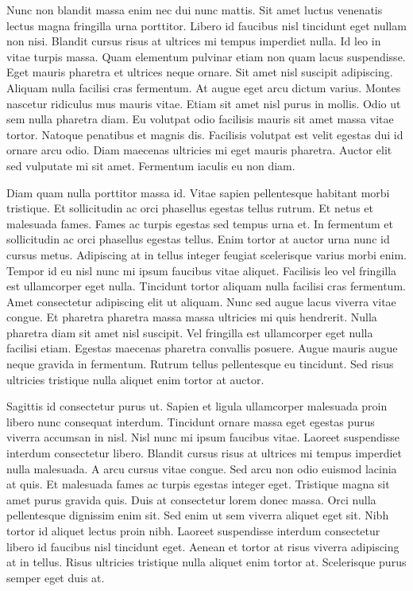 \documentclass[11pt,a4paper]{article}
\begin{document}
Nunc non blandit massa enim nec dui nunc mattis. Sit amet luctus venenatis lectus magna fringilla urna porttitor. Libero id faucibus nisl tincidunt eget nullam non nisi. Blandit cursus risus at ultrices mi tempus imperdiet nulla. Id leo in vitae turpis massa. Quam elementum pulvinar etiam non quam lacus suspendisse. Eget mauris pharetra et ultrices neque ornare. Sit amet nisl suscipit adipiscing. Aliquam nulla facilisi cras fermentum. At augue eget arcu dictum varius. Montes nascetur ridiculus mus mauris vitae. Etiam sit amet nisl purus in mollis. Odio ut sem nulla pharetra diam. Eu volutpat odio facilisis mauris sit amet massa vitae tortor. Natoque penatibus et magnis dis. Facilisis volutpat est velit egestas dui id ornare arcu odio. Diam maecenas ultricies mi eget mauris pharetra. Auctor elit sed vulputate mi sit amet. Fermentum iaculis eu non diam.

Diam quam nulla porttitor massa id. Vitae sapien pellentesque habitant morbi tristique. Et sollicitudin ac orci phasellus egestas tellus rutrum. Et netus et malesuada fames. Fames ac turpis egestas sed tempus urna et. In fermentum et sollicitudin ac orci phasellus egestas tellus. Enim tortor at auctor urna nunc id cursus metus. Adipiscing at in tellus integer feugiat scelerisque varius morbi enim. Tempor id eu nisl nunc mi ipsum faucibus vitae aliquet. Facilisis leo vel fringilla est ullamcorper eget nulla. Tincidunt tortor aliquam nulla facilisi cras fermentum. Amet consectetur adipiscing elit ut aliquam. Nunc sed augue lacus viverra vitae congue. Et pharetra pharetra massa massa ultricies mi quis hendrerit. Nulla pharetra diam sit amet nisl suscipit. Vel fringilla est ullamcorper eget nulla facilisi etiam. Egestas maecenas pharetra convallis posuere. Augue mauris augue neque gravida in fermentum. Rutrum tellus pellentesque eu tincidunt. Sed risus ultricies tristique nulla aliquet enim tortor at auctor.

Sagittis id consectetur purus ut. Sapien et ligula ullamcorper malesuada proin libero nunc consequat interdum. Tincidunt ornare massa eget egestas purus viverra accumsan in nisl. Nisl nunc mi ipsum faucibus vitae. Laoreet suspendisse interdum consectetur libero. Blandit cursus risus at ultrices mi tempus imperdiet nulla malesuada. A arcu cursus vitae congue. Sed arcu non odio euismod lacinia at quis. Et malesuada fames ac turpis egestas integer eget. Tristique magna sit amet purus gravida quis. Duis at consectetur lorem donec massa. Orci nulla pellentesque dignissim enim sit. Sed enim ut sem viverra aliquet eget sit. Nibh tortor id aliquet lectus proin nibh. Laoreet suspendisse interdum consectetur libero id faucibus nisl tincidunt eget. Aenean et tortor at risus viverra adipiscing at in tellus. Risus ultricies tristique nulla aliquet enim tortor at. Scelerisque purus semper eget duis at.
\end{document}
